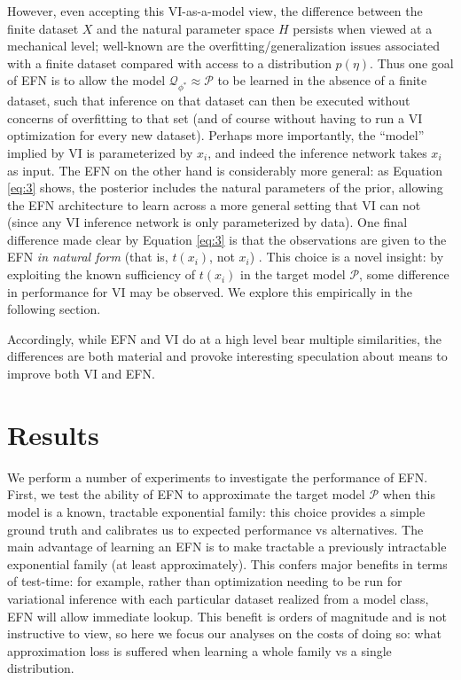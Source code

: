 \documentclass[twoside]{article}
\begin{document}
However, even accepting this VI-as-a-model view, the difference between the finite dataset $X$ and the natural parameter space $H$ persists when viewed at a mechanical level; well-known are the overfitting/generalization issues associated with a finite dataset compared with access to a distribution $p(\eta)$.    Thus one goal of EFN is to allow the model $\mathcal{Q}_{\phi^*} \approx \mathcal{P}$ to be learned in the absence of a finite dataset, such that inference on that dataset can then be executed without concerns of overfitting to that set (and of course without having to run a VI optimization for every new dataset).   Perhaps more importantly, the ``model'' implied by VI is parameterized by $x_i$, and indeed the inference network takes $x_i$ as input.  The EFN on the other hand is considerably more general:  as Equation \ref{eq:3} shows, the posterior includes the natural parameters of the prior, allowing the EFN architecture to learn across a more general setting that VI can not (since any VI inference network is only parameterized by data).  One final difference made clear by Equation \ref{eq:3} is that the observations are given to the EFN \emph{in natural form} (that is, $t(x_i)$, not $x_i$) \citep{robert2007bayesian}.  This choice is a novel insight: by exploiting the known sufficiency of $t(x_i)$ in the target model $\mathcal{P}$, some difference in performance for VI may be observed.  We explore this empirically in the following section.

Accordingly, while EFN and VI do at a high level bear multiple similarities, the differences are both material and provoke interesting speculation about means to improve both VI and EFN.


\section{Results}

We perform a number of experiments to investigate the performance of EFN.  First, we test the ability of EFN to approximate the target model $\mathcal{P}$ when this model is a known, tractable exponential family: this choice provides a simple ground truth and calibrates us to expected performance vs alternatives.    The main advantage of learning an EFN is to make tractable a previously intractable exponential family (at least approximately).  This confers major benefits in terms of test-time: for example, rather than optimization needing to be run for variational inference with each particular dataset realized from a model class, EFN will allow immediate lookup.  This benefit is orders of magnitude and is not instructive to view, so here we focus our analyses on the costs of doing so: what approximation loss is suffered when learning a whole family vs a single distribution.  
\end{document}
